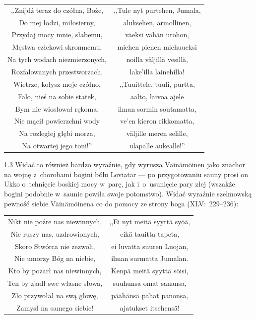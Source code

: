 \documentclass[11pt,a4paper,twoside]{report}
\begin{document}
{\centering
\small
\begin{longtable}{c c}
,,Znijdź teraz do czółna, Boże, & ,,Tule nyt purtehen, Jumala, \\
Do mej łodzi, miłosierny, & aluksehen, armollinen, \\
Przydaj mocy mnie, słabemu, & väeksi vähän urohon, \\
Męstwa człekowi skromnemu, & miehen pienen miehuueksi \\
Na tych wodach niezmierzonych, & noilla väljillä vesillä, \\
Rozfalowanych przestworzach. & lake'illa lainehilla! \\
Wietrze, kołysz moje czółno, & ,,Tuuittele, tuuli, purtta, \\
Falo, nieś na sobie statek, & aalto, laivoa ajele \\
Bym nie wiosłował rękoma, & ilman sormin soutamatta, \\
Nie mącił powierzchni wody & ve’en kieron rikkomatta, \\
Na rozległej głębi morza, & väljille meren selille, \\
Na otwartej jego toni!'' & ulapalle aukealle!'' \\
\end{longtable}
}
\begin{spacing}{1.3}
Widać to również bardzo wyraźnie, gdy wyrusza Väinämöinen jako znachor na wojnę z~chorobami bogini bólu Loviatar --- po przygotowaniu sauny prosi on Ukko o~tchnięcie boskiej mocy w~parę, jak i~o~usunięcie pary złej (wszakże bogini podobnie w~saunie powiła swoje potomstwo). Widać wyraźnie szelmowską pewność siebie Väinämöinena co do pomocy ze strony boga (XLV:~229--236):
\end{spacing}
\newpage
{\centering
\small
\begin{longtable}{c c}
Nikt nie poźre nas niewinnych, & ,,Ei nyt meitä syyttä syöä, \\
Nie ruszy nas, uzdrowionych,& eikä tauitta tapeta, \\
Skoro Stwórca nie zezwoli,& ei luvatta suuren Luojan, \\
Nie umorzy Bóg na niebie,& ilman surmatta Jumalan. \\
Kto by pożarł nas niewinnych,& Kenpä meitä syyttä söisi, \\
Ten by zjadł swe własne słowa,& suuhunsa omat sanansa, \\
Zło przywołał na swą głowę,& päähänsä pahat panonsa, \\
Zamysł na samego siebie!&ajatukset itsehensä! \\
\end{longtable}
}
\end{document}
